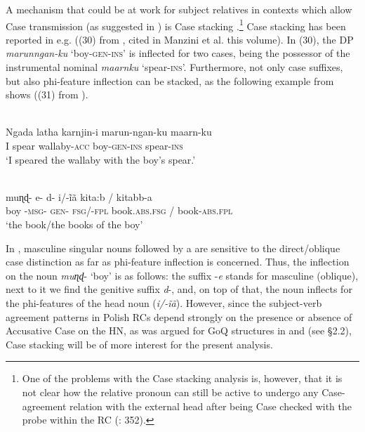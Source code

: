 \documentclass[output=paper]{langsci/langscibook}
\begin{document}
A mechanism that could be at work for subject relatives in contexts which allow Case transmission (as suggested in \citealt{Łęska2016}) is Case stacking \citep{Vogel2001}.\footnote{One of the problems with the Case stacking analysis is, however, that it is not clear how the relative pronoun can still be active to undergo any Case-agreement relation with the external head after being Case checked with the probe within the RC (\citealt{Georgi2014}: 352).} Case stacking has been reported in e.g.  ((30) from \citealt{Richards2013}, cited in Manzini et al. this volume). In (30), the DP \textit{marunngan-ku} ‘boy-\textsc{gen-ins}’ is inflected for two cases, being the possessor of the instrumental nominal \textit{maarnku} ‘spear\textsc{{}-ins}’. Furthermore, not only case suffixes, but also phi-feature inflection can be stacked, as the following example from  shows ((31) from \citealt[316]{Manzini2015}). 

\ea%
         \label{ex:leska:30}\\
    \gll Ngada   latha   karnjin-i   marun-ngan-ku   maarn-ku   \\
         I     spear   wallaby-\textsc{acc} boy-\textsc{gen-ins}   spear-\textsc{ins}\\
    \glt ‘I speared the wallaby with the boy’s spear.’
    \z

\ea%
          \citep[316]{Manzini2015}\label{ex:leska:31}\\
    \gll muɳɖ- e-   d-   i/-\~iã     kita:b /      kitabb-a       \\
         boy   {}-\textsc{msg}{}- \textsc{gen}{}-   \textsc{fsg}/-\textsc{fpl}   book.\textsc{abs.fsg} /   book-\textsc{abs.fpl}\\
    \glt ‘the book\slash the books of the boy’                
\z

In , masculine singular nouns followed by a  are sensitive to the direct\slash {}oblique case distinction as far as phi-feature inflection is concerned. Thus, the inflection on the noun \textit{muɳɖ}{}- ‘boy’ is as follows: the suffix -\textit{e} stands for masculine (oblique), next to it we find the genitive suffix \textit{d}{}-, and, on top of that, the noun inflects for the phi-features of the head noun (\textit{i/-\~iã}). However, since the subject-verb agreement patterns in Polish RCs depend strongly on the presence or absence of Accusative Case on the HN, as was argued for GoQ structures in \citet{Bošković2006} and \citealt{Witkoś2016} (see §2.2), Case stacking will be of more interest for the present analysis. 
\end{document}

